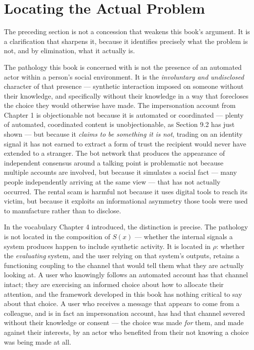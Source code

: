 \documentclass[12pt,a4paper]{book}
\begin{document}
\section{Locating the Actual Problem}

The preceding section is not a concession that weakens this book's argument. It is a clarification that sharpens it, because it identifies precisely what the problem is not, and by elimination, what it actually is.

The pathology this book is concerned with is not the presence of an automated actor within a person's social environment. It is the \emph{involuntary and undisclosed} character of that presence — synthetic interaction imposed on someone without their knowledge, and specifically without their knowledge in a way that forecloses the choice they would otherwise have made. The impersonation account from Chapter 1 is objectionable not because it is automated or coordinated — plenty of automated, coordinated content is unobjectionable, as Section 9.2 has just shown — but because it \emph{claims to be something it is not}, trading on an identity signal it has not earned to extract a form of trust the recipient would never have extended to a stranger. The bot network that produces the appearance of independent consensus around a talking point is problematic not because multiple accounts are involved, but because it simulates a social fact — many people independently arriving at the same view — that has not actually occurred. The rental scam is harmful not because it uses digital tools to reach its victim, but because it exploits an informational asymmetry those tools were used to manufacture rather than to disclose.

In the vocabulary Chapter 4 introduced, the distinction is precise. The pathology is not located in the composition of $S(x)$ — whether the internal signals a system produces happen to include synthetic activity. It is located in $\rho$: whether the \emph{evaluating} system, and the user relying on that system's outputs, retains a functioning coupling to the channel that would tell them what they are actually looking at. A user who knowingly follows an automated account has that channel intact; they are exercising an informed choice about how to allocate their attention, and the framework developed in this book has nothing critical to say about that choice. A user who receives a message that appears to come from a colleague, and is in fact an impersonation account, has had that channel severed without their knowledge or consent — the choice was made \emph{for} them, and made against their interests, by an actor who benefited from their not knowing a choice was being made at all.
\end{document}
